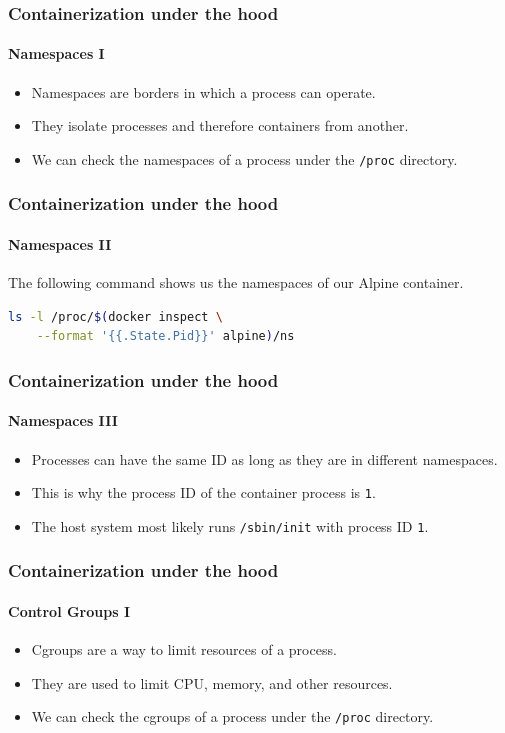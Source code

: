 \begin{frame}
    \frametitle{Containerization under the hood}
    \framesubtitle{Namespaces I}
    \begin{itemize}
        \item Namespaces are borders in which a process can operate.
        \item They isolate processes and therefore containers from another.
        \item We can check the namespaces of a process under the \texttt{/proc} directory.
    \end{itemize}
\end{frame}

\begin{frame}[fragile]
    \frametitle{Containerization under the hood}
    \framesubtitle{Namespaces II}
    The following command shows us the namespaces of our Alpine container.
    \vspace{0.5cm}
    \begin{lstlisting}[language=bash]
ls -l /proc/$(docker inspect \
    --format '{{.State.Pid}}' alpine)/ns
    \end{lstlisting}
\end{frame}

\begin{frame}
    \frametitle{Containerization under the hood}
    \framesubtitle{Namespaces III}
    \begin{itemize}
        \item Processes can have the same ID as long as they are in different namespaces.
        \item This is why the process ID of the container process is \texttt{1}.
        \item The host system most likely runs \texttt{/sbin/init} with process ID \texttt{1}.
    \end{itemize}
\end{frame}

\begin{frame}
    \frametitle{Containerization under the hood}
    \framesubtitle{Control Groups I}
    \begin{itemize}
        \item Cgroups are a way to limit resources of a process.
        \item They are used to limit CPU, memory, and other resources.
        \item We can check the cgroups of a process under the \texttt{/proc} directory.
    \end{itemize}
\end{frame}


